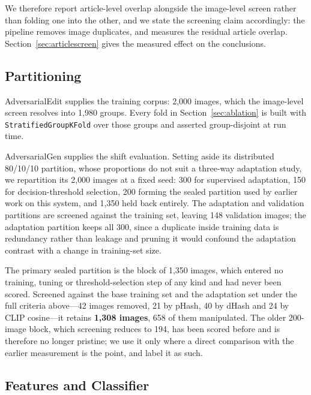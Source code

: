 We therefore report article-level overlap alongside the image-level screen
rather than folding one into the other, and we state the screening claim
accordingly: the pipeline removes image duplicates, and measures the residual
article overlap. Section~\ref{sec:articlescreen} gives the measured effect on
the conclusions.

\subsection{Partitioning}
\label{sec:partition}

AdversarialEdit supplies the training corpus: 2{,}000 images, which the
image-level screen resolves into 1{,}980 groups. Every fold in
Section~\ref{sec:ablation} is built with \texttt{StratifiedGroupKFold} over
those groups and asserted group-disjoint at run time.

AdversarialGen supplies the shift evaluation. Setting aside its distributed
80/10/10 partition, whose proportions do not suit a three-way adaptation study,
we repartition its 2{,}000 images at a fixed seed: 300 for supervised
adaptation, 150 for decision-threshold selection, 200 forming the sealed
partition used by earlier work on this system, and 1{,}350 held back entirely.
The adaptation and validation partitions are screened against the training set,
leaving 148 validation images; the adaptation partition keeps all 300, since a
duplicate inside training data is redundancy rather than leakage and pruning it
would confound the adaptation contrast with a change in training-set size.

The primary sealed partition is the block of 1{,}350 images, which entered no
training, tuning or threshold-selection step of any kind and had never been
scored. Screened against the base training set and the adaptation set under the
full criteria above---42 images removed, 21 by pHash, 40 by dHash and 24 by
CLIP cosine---it retains \textbf{1{,}308 images}, 658 of them manipulated. The
older 200-image block, which screening reduces to 194, has been scored before
and is therefore no longer pristine; we use it only where a direct comparison
with the earlier measurement is the point, and label it as such.

\subsection{Features and Classifier}
\label{sec:features}

